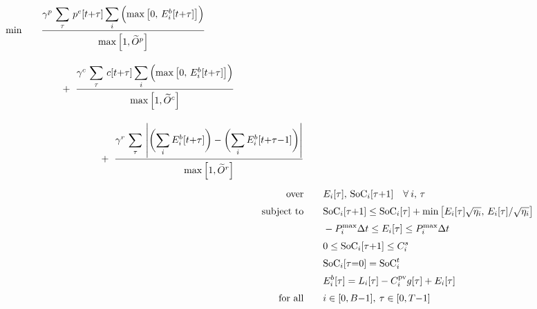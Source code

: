 \newpage
\begin{subequations} \label{eq:forecasting-LP-example}
    \begin{align}
        \addtocounter{equation}{-1}
        \begin{split}
        \text{min} & \qquad \frac{\gamma^p \,\, \mathlarger{\sum}_{\tau} \,\, p^e[t{+}\tau] \, \mathlarger{\sum_i} \left( \max \left[ 0,\, E_i^b[t{+}\tau] \right] \right)}{\raisebox{-1.2ex}{$\max \left[ 1, \widetilde{O}^p \right]$}} \\[1em]
        & \qquad\qquad + \,\, \frac{\gamma^c \,\, \mathlarger{\sum}_{\tau} \,\, c[t{+}\tau] \, \mathlarger{\sum_i} \left( \max \left[ 0,\, E_i^b[t{+}\tau] \right] \right)}{\raisebox{-1.2ex}{$\max \left[ 1, \widetilde{O}^c \right]$}} \\[1em]
        & \qquad\qquad\qquad\qquad + \,\, \frac{\gamma^r \,\, \mathlarger{\sum}_{\tau} \,\, \abs{\bigg( \mathlarger{\sum_i} \, E_i^b[t{+}\tau] \bigg) - \bigg( \mathlarger{\sum_i} \, E_i^b[t{+}\tau{-}1] \bigg)} }{\raisebox{-1.2ex}{$\max \left[ 1, \widetilde{O}^r \right]$}}
        \end{split} \label{eq:forecasting-lp} \\[1ex]
        \text{over} & \qquad E_i[\tau] , \, \textrm{SoC}_i[\tau{+}1] \quad \forall \: i,\, \tau \tag*{} \\
        \text{subject to} & \qquad \textrm{SoC}_i[\tau{+}1] \leq \textrm{SoC}_i[\tau] + \min\left[ E_i[\tau] \sqrt{\eta_i},\, E_i[\tau]/\sqrt{\eta_i} \right] \label{eq:forecasting-dynamics-constraint} \\
        & \qquad -P^{\textrm{max}}_i \Delta t \leq E_i[\tau] \leq P^{\textrm{max}}_i \Delta t \label{eq:forecasting-power-constraint} \\
        & \qquad 0 \leq \textrm{SoC}_i[\tau{+}1] \leq C^s_i \label{eq:forecasting-energy-constraint} \\
        & \qquad \textrm{SoC}_i[\tau{=}0] = \textrm{SoC}_i^t \label{eq:forecasting-initial-conditions} \\
        & \qquad E^b_i[\tau] = L_i[\tau] - C^{\textrm{pv}}_i g[\tau] + E_i[\tau] \label{eq:forecasting-aggregation-constraint} \\
        \text{for all} & \qquad i \in [0,B{-}1], \: \tau \in [0,T{-}1] \tag*{}
    \end{align}
\end{subequations}

